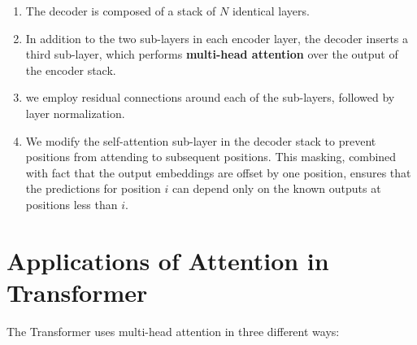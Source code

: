 \begin{enumerate}
    \item The decoder is composed of a stack of $N$ identical layers.
    \hfill \cite{arxiv/1706.03762/Attention-Is-All-You-Need}

    \item In addition to the two sub-layers in each encoder layer, the decoder inserts a third sub-layer, which performs \textbf{multi-head attention} over the output of the encoder stack.
    \hfill \cite{arxiv/1706.03762/Attention-Is-All-You-Need}

    \item we employ residual connections around each of the sub-layers, followed by layer normalization. 
    \hfill \cite{arxiv/1706.03762/Attention-Is-All-You-Need}

    \item We modify the self-attention sub-layer in the decoder stack to prevent positions from attending to subsequent positions.
    This masking, combined with fact that the output embeddings are offset by one position, ensures that the predictions for position $i$ can depend only on the known outputs at positions less than $i$.
    \hfill \cite{arxiv/1706.03762/Attention-Is-All-You-Need}
\end{enumerate}




\section{Applications of Attention in Transformer}

The Transformer uses multi-head attention in three different ways:


